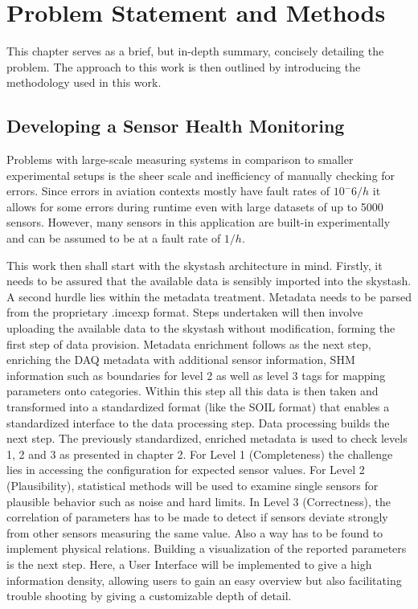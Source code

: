 \chapter{Problem Statement and Methods}

This chapter serves as a brief, but in-depth summary, concisely detailing the problem. The approach to this work is then outlined by introducing the methodology used in this work.

\section{Developing a Sensor Health Monitoring}

Problems with large-scale measuring systems in comparison to smaller experimental setups is the sheer scale and inefficiency of manually checking for errors. Since errors in aviation contexts mostly have fault rates of $10^-6/h$ it allows for some errors during runtime even with large datasets of up to 5000 sensors. However, many sensors in this application are built-in experimentally and can be assumed to be at a fault rate of $1/h$.

This work then shall start with the skystash architecture in mind. Firstly, it needs to be assured that the available data is sensibly imported into the skystash. A second hurdle lies within the metadata treatment. Metadata needs to be parsed from the proprietary .imcexp format. Steps undertaken will then involve uploading the available data to the skystash without modification, forming the first step of data provision.
Metadata enrichment follows as the next step, enriching the DAQ metadata with additional sensor information, SHM information such as boundaries for level 2 as well as level 3 tags for mapping parameters onto categories. Within this step all this data is then taken and transformed into a standardized format (like the SOIL format) that enables a standardized interface to the data processing step.
Data processing builds the next step. The previously standardized, enriched metadata is used to check levels 1, 2 and 3 as presented in chapter 2. For Level 1 (Completeness) the challenge lies in accessing the configuration for expected sensor values. For Level 2 (Plausibility), statistical methods will be used to examine single sensors for plausible behavior such as noise and hard limits. In Level 3 (Correctness), the correlation of parameters has to be made to detect if sensors deviate strongly from other sensors measuring the same value. Also a way has to be found to implement physical relations.
Building a visualization of the reported parameters is the next step. Here, a User Interface will be implemented to give a high information density, allowing users to gain an easy overview but also facilitating trouble shooting by giving a customizable depth of detail.

